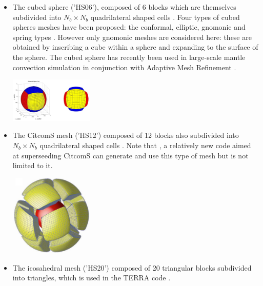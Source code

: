 \begin{itemize}
\item 
The cubed sphere ('HS06'), composed of 6 blocks which 
are themselves subdivided into $N_b \times N_b$ quadrilateral shaped cells  \cite{sado72,roip96,heta03,busa13}.
Four types of cubed spheres meshes have been proposed: the conformal, elliptic, gnomonic and spring types \cite{puli07}.
However only gnomonic meshes are considered here: these are obtained by inscribing a cube within a sphere and expanding to the surface
of the sphere.
The cubed sphere has recently been used in large-scale mantle convection simulation in conjunction with 
Adaptive Mesh Refinement \cite{algs12,busa13}.  

\begin{center}
\includegraphics[width=4cm]{images/ghost/hs06}
\end{center}



\item 
The CitcomS mesh ('HS12') composed of 12 blocks also subdivided 
into $N_b \times N_b$ quadrilateral shaped cells
\cite{zhzm00,sthh06,zhmt08,arfw14}.
Note that \aspect{} \cite{krhb12,hedg17}, a relatively new code aimed at 
superseeding CitcomS can generate and use 
this type of mesh \cite{thie17} but is not limited to it.

\begin{center}
\includegraphics[width=4cm]{images/ghost/citcom12}
\end{center}


\item The icosahedral mesh ('HS20') composed of 20 triangular blocks \cite{bafr85,baum85} subdivided into triangles, which is 
used in the TERRA code \cite{burb96,burb97,burl98,dadb13}.
\end{itemize}


